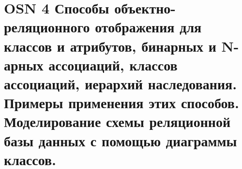 \section*{OSN 4 Способы объектно-реляционного отображения для классов и атрибутов, бинарных и N-арных ассоциаций, классов ассоциаций, иерархий наследования. Примеры применения этих способов. Моделирование схемы реляционной базы данных с помощью диаграммы классов.}
